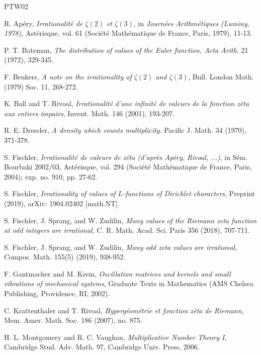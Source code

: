 \documentclass[11pt]{amsart}
\numberwithin{equation}{section}
\begin{document}
\begin{thebibliography}{PTW02}

 R. Ap{\'e}ry, \textit{Irrationalit{\'e} de $\zeta(2)$ et $\zeta(3)$}, in \textit{Journ{\'e}es Arithm{\'e}tiques (Luminy, 1978)}, Ast{\'e}risque, vol. 61 (Soci{\'e}t{\'e} Math{\'e}matique de France, Paris, 1979), 11-13.

 P. T. Bateman, \textit{The distribution of values of the Euler function, Acta Arith}. 21 (1972), 329-345.

 F. Beukers, \textit{A note on the irrationality of $\zeta(2)$ and $\zeta(3)$}, Bull. London Math. (1979) Soc. 11, 268-272.

  K. Ball and T. Rivoal, \textit{Irrationalit{\'e} d'une infinit{\'e} de valeurs de la fonction z{\^e}ta aux entiers impairs}, Invent. Math. 146 (2001), 193-207.

 R. E. Dressler, \textit{A density which counts multiplicity}. Pacific J. Math. 34 (1970), 371-378.

 S. Fischler, \textit{Irrationalit{\'e} de valeurs de z{\^e}ta (d'apr{\`e}s Ap{\'e}ry, Rivoal, ...)}, in S{\'e}m. Bourbaki 2002/03, Ast{\'e}risque, vol. 294 (Soci{\'e}t{\'e} Math{\'e}matique de France, Paris, 2004); exp. no. 910, pp. 27-62.

 S. Fischler, \textit{Irrationality of values of $L$-functions of Dirichlet characters}, Preprint (2019), arXiv: 1904.02402 [math.NT].

  S. Fischler, J. Sprang, and W. Zudilin, \textit{Many values of the Riemann zeta function
at odd integers are irrational}, C. R. Math. Acad. Sci. Paris 356 (2018), 707-711.

  S. Fischler, J. Sprang, and W. Zudilin, \textit{Many odd zeta values are irrational}, Compos. Math. 155(5) (2019), 938-952.


 F. Gantmacher and M. Krein, \textit{Oscillation matrices and kernels and small vibrations of
mechanical systems}, Graduate Texts in Mathematics (AMS Chelsea Publishing, Providence, RI, 2002).

 C. Krattenthaler and T. Rivoal, \textit{Hyperg{\'e}om{\'e}trie et fonction z{\^e}ta de Riemann}, Mem. Amer.
Math. Soc. 186 (2007), no. 875.

 H. L. Montgomery and R. C. Vaughan, \textit{Multiplicative Number Theory I}, Cambridge Stud. Adv. Math. 97, Cambridge Univ. Press, 2006.


\end{thebibliography}
\end{document}
